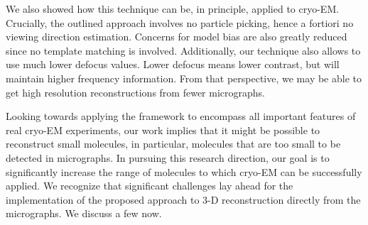 \documentclass[9pt,twocolumn,twoside,lineno]{pnas-new}
\begin{document}
We also showed how this technique can be, in principle, applied to cryo-EM.
Crucially, the outlined approach involves no particle picking, hence a fortiori no viewing direction estimation. Concerns for model bias are also greatly reduced since no template matching is involved.
Additionally,  our technique also allows to use much lower defocus values. Lower defocus means lower contrast, but will maintain  higher frequency information. From that perspective, we may be able to get high resolution reconstructions from fewer micrographs. %


Looking towards applying the framework to encompass all important features of real cryo-EM experiments, our work implies that it might be possible to reconstruct small molecules, in particular, molecules that are too small to be detected in micrographs. 
In pursuing this research direction, our goal is to significantly increase the range of molecules to which cryo-EM can be successfully applied.
We recognize that significant challenges lay ahead for the implementation of the proposed approach to 3-D reconstruction directly from the micrographs. We discuss a few now.


%

\end{document}
